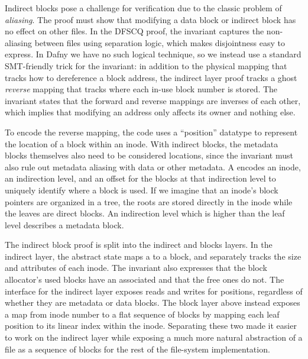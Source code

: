 Indirect blocks pose a challenge for verification due to the classic problem of
\emph{aliasing}. The proof must show that modifying a data block or indirect
block has no effect on other files. In the DFSCQ proof, the invariant
captures the non-aliasing between files using separation logic, which makes
disjointness easy to express. In Dafny we have no such logical
technique, so we instead use a standard SMT-friendly trick for the invariant: in
addition to the physical mapping that tracks how to dereference a block address,
the indirect layer proof tracks a ghost \emph{reverse} mapping that tracks where
each in-use block number is stored. The invariant states that the forward and reverse
mappings are inverses of each other, which implies that modifying an address
only affects its owner and nothing else.

To encode the reverse mapping, the code uses a ``position'' datatype  to
represent the location of a block within an inode. With indirect blocks, the
metadata blocks themselves also need to be considered locations, since the
invariant must also rule out metadata aliasing with data or other metadata. A
 encodes an inode, an indirection level, and an offset for the blocks at
that indirection level to uniquely identify where a block is used. If we imagine
that an inode's block pointers are organized in a tree, the roots are stored
directly in the inode while the leaves are direct blocks. An indirection level
which is higher than the leaf level describes a metadata block.

The indirect block proof is split into the indirect and blocks layers. In the
indirect layer, the abstract state maps a  to a block, and separately
tracks the size and attributes of each inode. The invariant also expresses that
the block allocator's used blocks have an associated  and that the free
ones do not. The interface for the indirect layer exposes reads and writes for
positions, regardless of whether they are metadata or data blocks. The block
layer above instead exposes a map from inode number to a flat sequence of blocks by
mapping each leaf position to its linear index within the inode. Separating
these two made it easier to work on the indirect layer while exposing a much
more natural abstraction of a file as a sequence of blocks for the rest of the
file-system implementation.


